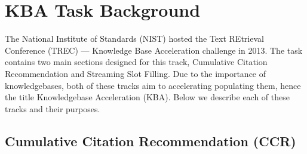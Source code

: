 \section{KBA Task Background}
\label{sec:kbatask}
The National Institute of Standards (NIST) hosted the
Text REtrieval Conference (TREC) --- Knowledge Base Acceleration challenge in 2013. The task
contains two main sections designed for this track, Cumulative Citation Recommendation 
and Streaming Slot Filling. Due to the importance of knowledgebases, both of these 
tracks aim to accelerating populating them, hence the title Knowledgebase Acceleration (KBA).
Below we describe each of these tracks and their purposes.

\subsection{Cumulative Citation Recommendation (CCR)}

